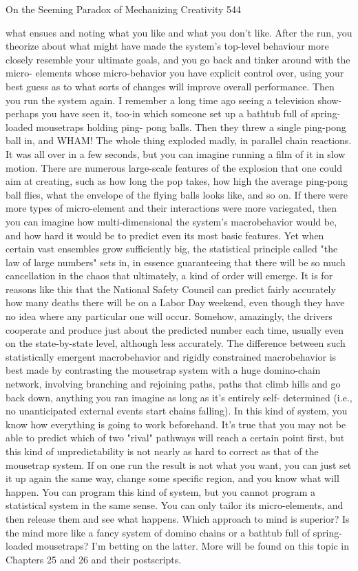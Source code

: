 On the Seeming Paradox of Mechanizing Creativity                                      544

what ensues and noting what you like and what you don't like. After the run, you
theorize about what might have made the system's top-level behaviour more closely
resemble your ultimate goals, and you go back and tinker around with the micro-
elements whose micro-behavior you have explicit control over, using your best guess
as to what sorts of changes will improve overall performance. Then you run the
system again.
        I remember a long time ago seeing a television show-perhaps you have seen it,
too-in which someone set up a bathtub full of spring-loaded mousetraps holding ping-
pong balls. Then they threw a single ping-pong ball in, and WHAM! The whole thing
exploded madly, in parallel chain reactions. It was all over in a few seconds, but you
can imagine running a film of it in slow motion. There are numerous large-scale
features of the explosion that one could aim at creating, such as how long the pop
takes, how high the average ping-pong ball flies, what the envelope of the flying balls
looks like, and so on. If there were more types of micro-element and their interactions
were more variegated, then you can imagine how multi-dimensional the system's
macrobehavior would be, and how hard it would be to predict even its most basic
features.
        Yet when certain vast ensembles grow sufficiently big, the statistical principle
called "the law of large numbers" sets in, in essence guaranteeing that there will be so
much cancellation in the chaos that ultimately, a kind of order will emerge. It is for
reasons like this that the National Safety Council can predict fairly accurately how
many deaths there will be on a Labor Day weekend, even though they have no idea
where any particular one will occur. Somehow, amazingly, the drivers cooperate and
produce just about the predicted number each time, usually even on the state-by-state
level, although less accurately.
        The difference between such statistically emergent macrobehavior and rigidly
constrained macrobehavior is best made by contrasting the mousetrap system with a
huge domino-chain network, involving branching and rejoining paths, paths that
climb hills and go back down, anything you ran imagine as long as it's entirely self-
determined (i.e., no unanticipated external events start chains falling). In this kind of
system, you know how everything is going to work beforehand. It's true that you may
not be able to predict which of two "rival" pathways will reach a certain point first,
but this kind of unpredictability is not nearly as hard to correct as that of the
mousetrap system. If on one run the result is not what you want, you can just set it up
again the same way, change some specific region, and you know what will happen.
You can program this kind of system, but you cannot program a statistical system in
the same sense. You can only tailor its micro-elements, and then release them and see
what happens.
        Which approach to mind is superior? Is the mind more like a fancy system of
domino chains or a bathtub full of spring-loaded mousetraps? I'm betting on the latter.
More will be found on this topic in Chapters 25 and 26 and their postscripts.




